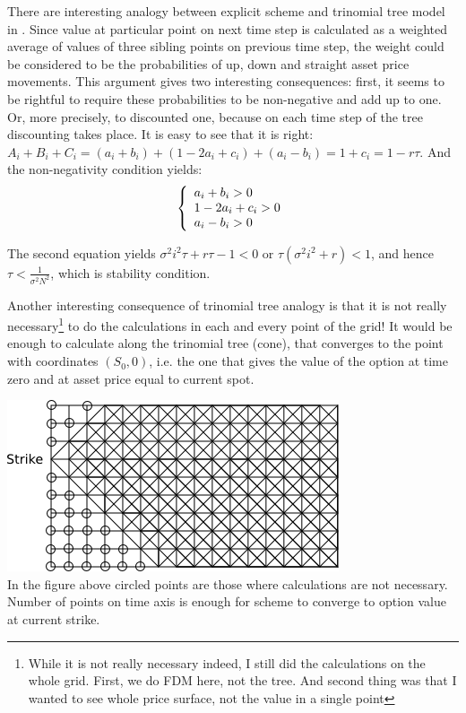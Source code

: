 \documentclass[11pt]{article} %
\begin{document}
There are interesting analogy between explicit scheme and trinomial tree model in \cite[ch. ???]{Hull03}. Since value at particular point on next time step is calculated as a weighted average of values of three sibling points on previous time step, the weight could be considered to be the probabilities of up, down and straight asset price movements. This argument gives two interesting consequences: first, it seems to be rightful to require these probabilities to be non-negative and add up to one. Or, more precisely, to discounted one, because on each time step of the tree discounting takes place. It is easy to see that it is right: $A_i + B_i + C_i = (a_i+b_i) + (1-2a_i+c_i) +(a_i-b_i) = 1 + c_i = 1 - r\tau$. And the non-negativity condition yields:
\[
\left\{
\begin{array}{l l l}
    a_i + b_i > 0\\
    1-2a_i+c_i > 0\\
    a_i-b_i > 0
  \end{array}
\right.
\]

The second equation yields $\sigma^2 i^2 \tau + r \tau - 1<0$ or $\tau(\sigma^2 i^2 + r) < 1$, and hence $\tau < \frac{1}{\sigma^2 N^2}$, which is stability condition.

Another interesting consequence of trinomial tree analogy is that it is not really necessary\footnote{While it is not really necessary indeed, I still did the calculations on the whole grid. First, we do FDM here, not the tree. And second thing was that I wanted to see whole price surface, not the value in a single point} to do the calculations in each and every point of the grid! It would be enough to calculate along the trinomial tree (cone), that converges to the point with coordinates $(S_0, 0)$, i.e. the one that gives the value of the option at time zero and at asset price equal to current spot.

\includegraphics[scale=0.5]{convergent-tree.png}\\
In the figure above circled points are those where calculations are not necessary. Number of points on time axis is enough for scheme to converge to option value at current strike. 
\end{document}
